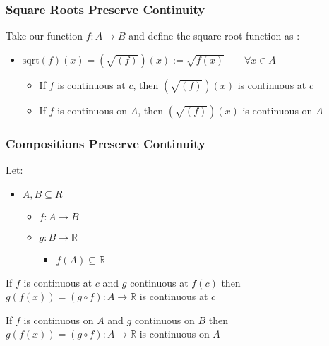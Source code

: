 \documentclass[
]{article}
\begin{document}
\hypertarget{header-n3954}{%
\subsubsection{Square Roots Preserve Continuity}\label{header-n3954}}

Take our function \(f: A \rightarrow B\) and define the square root
function as :

\begin{itemize}
\item
  \(\text{sqrt}(f)(x) = \left(\sqrt{(f)}\right) \left(x\right) := \sqrt{f(x)} \qquad\forall x \in A\)

  \begin{itemize}
  \item
    If \(f\) is continuous at \(c\), then
    \( \left(\sqrt{(f)}\right) \left(x\right)\) is continuous at \(c\) 
  \item
    If \(f\) is continuous on \(A\), then
    \( \left(\sqrt{(f)}\right) \left(x\right)\) is continuous on \(A\) 
  \end{itemize}
\end{itemize}

\hypertarget{header-n3964}{%
\subsubsection{Compositions Preserve Continuity}\label{header-n3964}}

Let:

\begin{itemize}
\item
  \(A, B \subseteq R\)

  \begin{itemize}
  \item
    \(f: A \rightarrow B\) 
  \item
    \(g: B\rightarrow \mathbb{R}\)

    \begin{itemize}
    \item
      \(f(A) \subseteq \mathbb{R}\) 
    \end{itemize}
  \end{itemize}
\end{itemize}

If \(f\) is continuous at \(c\) and \(g\) continuous at \(f(c)\) then
\(g\left( f\left( x\right) \right) = \left(g \circ f \right): A \rightarrow \mathbb{R}\)
is continuous at \(c\)

If \(f\) is continuous on \(A\) and \(g\) continuous on \(B\) then
\(g\left( f\left( x\right) \right) = \left(g \circ f \right): A \rightarrow \mathbb{R}\)
is continuous on \(A\)
\end{document}
